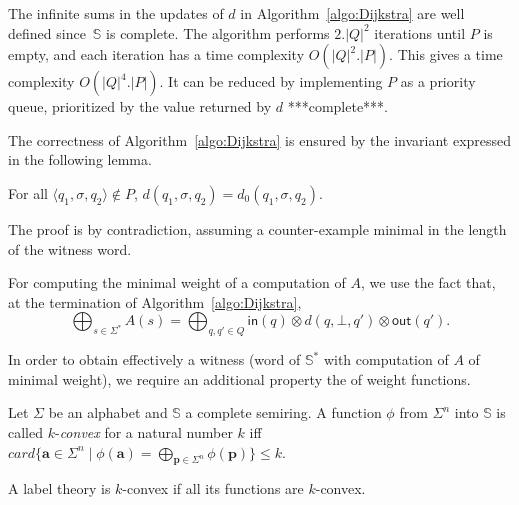 \documentclass[runningheads]{llncs}
\def\<#1>{\langle #1 \rangle}
\newcommand{\Semiring}{\mathbb{S}}
\begin{document}
\noindent
The infinite sums in the updates of $d$ in Algorithm~\ref{algo:Dijkstra} are well defined
since~$\Semiring$ is complete.
The algorithm performs $2.|Q|^2$ iterations until $P$ is empty, 
and each iteration has a time complexity $O(|Q|^2 . |P|)$.
This gives a time complexity $O(|Q|^4 . |P|)$. 
It can be reduced by implementing $P$ as a priority queue, 
prioritized by the value returned by $d$
***complete***. %

The correctness of Algorithm~\ref{algo:Dijkstra} 
is ensured by the invariant expressed in the following lemma.
\begin{lemma}
For all $\< q_1, \sigma, q_2> \notin P$, $d(q_1, \sigma, q_2) =  d_0(q_1, \sigma, q_2)$.
\end{lemma}
The proof is by contradiction, 
assuming a counter-example minimal in the length of the witness word.




\noindent
For computing the minimal weight of a computation of $A$, we use the fact that,
at the termination of Algorithm~\ref{algo:Dijkstra}, %
\[
  {\displaystyle \bigoplus_{s \in \Sigma^*} A(s)} = 
  {\displaystyle\bigoplus_{q, q' \in Q}} \textstyle
  \mathsf{in}(q) \mathop{\otimes} d(q, \bot, q') \mathop{\otimes} \mathsf{out}(q').
\]

\noindent
In order to obtain effectively a witness 
(word of $\Semiring^*$ with computation of $A$ of minimal weight), 
we require an additional property the of weight functions.
\begin{definition}
Let $\Sigma$ be an alphabet and $\Semiring$ a complete semiring.
A function $\phi$ from $\Sigma^n$ into $\Semiring$
is called $k$-\emph{convex} for a natural number $k$ iff 
$\mathit{card}\{ \mathbf{a} \in \Sigma^n \mid \phi(\mathbf{a}) = 
                 \displaystyle\bigoplus_{\mathbf{p} \in \Sigma^n} \phi(\mathbf{p}) \} \leq k$.
\end{definition}
A label theory is $k$-convex if all its functions are $k$-convex.
\end{document}
